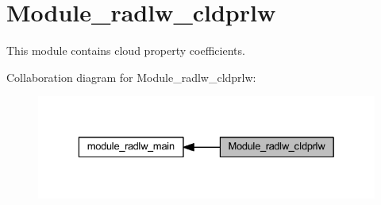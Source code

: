 \hypertarget{group__module__radlw__cldprlw}{}\section{Module\+\_\+radlw\+\_\+cldprlw}
\label{group__module__radlw__cldprlw}


This module contains cloud property coefficients.  


Collaboration diagram for Module\+\_\+radlw\+\_\+cldprlw\+:\nopagebreak
\begin{figure}[H]
\begin{center}
\leavevmode
\includegraphics[width=329pt]{group__module__radlw__cldprlw}
\end{center}
\end{figure}
